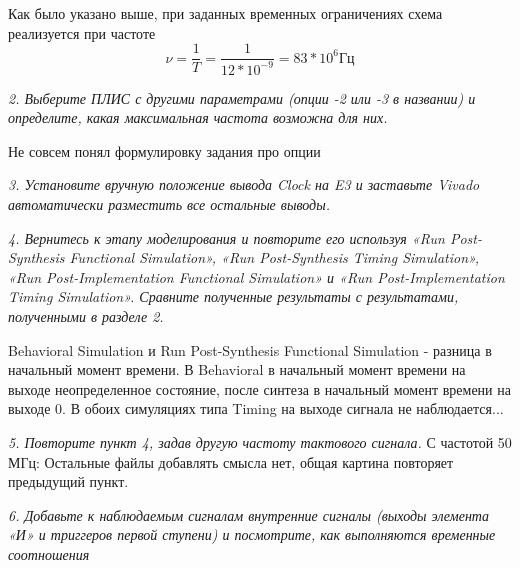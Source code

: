 \begin{sloppypar}
Как было указано выше, при заданных временных ограничениях схема реализуется при частоте  	\begin{displaymath}\nu=\frac{1}{T}=\frac{1}{12*10^{-9}}=83*10^6 Гц\end{displaymath}


\textit {2. Выберите ПЛИС с другими параметрами (опции -2 или -3 в названии) и определите, какая максимальная частота возможна для них.}

Не совсем понял формулировку задания про опции

\textit {3. Установите вручную положение вывода Clock на E3 и заставьте Vivado автоматически разместить все остальные выводы.}

\textit {4. Вернитесь к этапу моделирования и повторите его используя «Run Post-Synthesis Functional Simulation», «Run Post-Synthesis Timing Simulation», «Run Post-Implementation Functional Simulation» и «Run Post-Implementation Timing Simulation». Сравните полученные результаты с результатами, полученными в разделе 2.}


Behavioral Simulation и Run Post-Synthesis Functional Simulation - разница в начальный момент времени. В Behavioral в начальный момент времени на выходе  неопределенное состояние, после синтеза в начальный момент времени на выходе 0. В обоих симуляциях типа Timing на выходе сигнала не наблюдается...

\textit {5. Повторите пункт 4, задав другую частоту тактового сигнала.}
С частотой 50 МГц: 
Остальные файлы добавлять смысла нет, общая картина повторяет предыдущий пункт.

\textit {6. Добавьте к наблюдаемым сигналам внутренние сигналы (выходы элемента «И» и триггеров первой ступени) и посмотрите, как выполняются временные соотношения}


\end{sloppypar}
